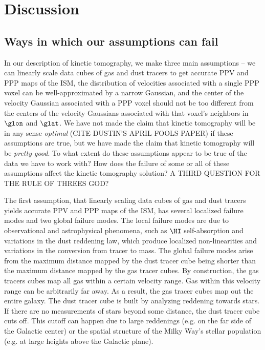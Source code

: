 \section{Discussion}
\label{sec:discussion}

\subsection{Ways in which our assumptions can fail}
\label{sec:discussion-systematics}
In our description of kinetic tomography, we make three main assumptions -- we can linearly scale data cubes of gas and dust tracers to get accurate PPV and PPP maps of the ISM, the distribution of velocities associated with a single PPP voxel can be well-approximated by a narrow Gaussian, and the center of the velocity Gaussian associated with a PPP voxel should not be too different from the centers of the velocity Gaussians associated with that voxel's neighbors in $\glon$ and $\glat$. 
We have not made the claim that kinetic tomography will be in any sense \emph{optimal} (CITE DUSTIN'S APRIL FOOLS PAPER) if these assumptions are true, but we have made the claim that kinetic tomography will be \emph{pretty good}. 
To what extent do these assumptions appear to be true of the data we have to work with?
How does the failure of some or all of these assumptions affect the kinetic tomography solution? 
A THIRD QUESTION FOR THE RULE OF THREES GOD?

The first assumption, that linearly scaling data cubes of gas and dust tracers yields accurate PPV and PPP maps of the ISM, has several localized failure modes and two global failure modes. 
The local failure modes are due to observational and astrophysical phenomena, such as $\HI$ self-absorption and variations in the dust reddening law, which produce localized non-linearities and variations in the conversion from tracer to mass. 
The global failure modes arise from the maximum distance mapped by the dust tracer cube being shorter than the maximum distance mapped by the gas tracer cubes. 
By construction, the gas tracers cubes map all gas within a certain velocity range. 
Gas within this velocity range can be arbitrarily far away. 
As a result, the gas tracer cubes map out the entire galaxy.
The dust tracer cube is built by analyzing reddening towards stars. If there are no measurements of stars beyond some distance, the dust tracer cube cuts off.
This cutoff can happen due to large reddenings (e.g. on the far side of the Galactic center) or the spatial structure of the Milky Way's stellar population (e.g. at large heights above the Galactic plane).

